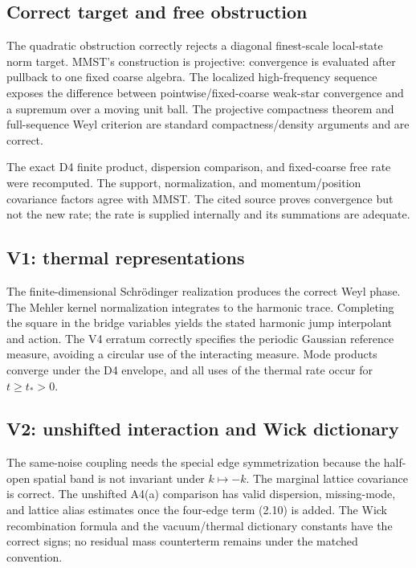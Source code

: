 \documentclass[11pt,a4paper]{article}
\begin{document}
\subsection{Correct target and free obstruction}

The quadratic obstruction correctly rejects a diagonal finest-scale local-state norm
target.  MMST's construction is projective: convergence is evaluated after pullback to
one fixed coarse algebra.  The localized high-frequency sequence exposes the difference
between pointwise/fixed-coarse weak-star convergence and a supremum over a moving unit
ball.  The projective compactness theorem and full-sequence Weyl criterion are standard
compactness/density arguments and are correct.

The exact D4 finite product, dispersion comparison, and fixed-coarse free rate were
recomputed.  The support, normalization, and momentum/position covariance factors agree
with MMST.  The cited source proves convergence but not the new rate; the rate is supplied
internally and its summations are adequate.

\subsection{V1: thermal representations}

The finite-dimensional Schr\"odinger realization produces the correct Weyl phase.  The
Mehler kernel normalization integrates to the harmonic trace.  Completing the square in
the bridge variables yields the stated harmonic jump interpolant and action.  The V4
erratum correctly specifies the periodic Gaussian reference measure, avoiding a circular
use of the interacting measure.  Mode products converge under the D4 envelope, and all
uses of the thermal rate occur for $t\ge t_*>0$.

\subsection{V2: unshifted interaction and Wick dictionary}

The same-noise coupling needs the special edge symmetrization because the half-open
spatial band is not invariant under $k\mapsto-k$.  The marginal lattice covariance is
correct.  The unshifted A4(a) comparison has valid dispersion, missing-mode, and lattice
alias estimates once the four-edge term (2.10) is added.  The Wick recombination formula
and the vacuum/thermal dictionary constants have the correct signs; no residual mass
counterterm remains under the matched convention.
\end{document}
